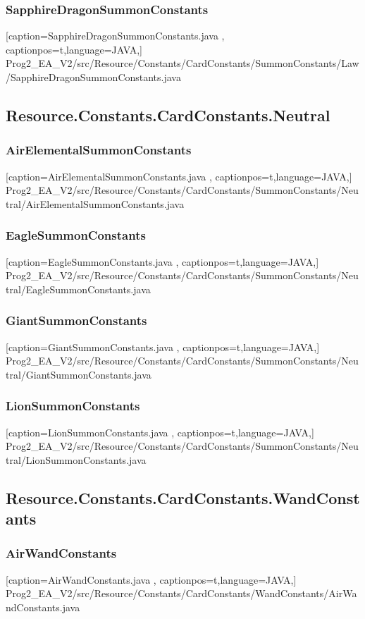 \documentclass[a4paper,12pt]{scrartcl}
\begin{document}
	\subsubsection{SapphireDragonSummonConstants}
	
	[caption={SapphireDragonSummonConstants.java}
	\label{lst:javaclass},
	captionpos=t,language=JAVA,]
	{Prog2_EA_V2/src/Resource/Constants/CardConstants/SummonConstants/Law/SapphireDragonSummonConstants.java}
	\subsection{Resource.Constants.CardConstants.Neutral}
	\subsubsection{AirElementalSummonConstants}
	
	[caption={AirElementalSummonConstants.java}
	\label{lst:javaclass},
	captionpos=t,language=JAVA,]
	{Prog2_EA_V2/src/Resource/Constants/CardConstants/SummonConstants/Neutral/AirElementalSummonConstants.java}
	\subsubsection{EagleSummonConstants}
	
	[caption={EagleSummonConstants.java}
	\label{lst:javaclass},
	captionpos=t,language=JAVA,]
	{Prog2_EA_V2/src/Resource/Constants/CardConstants/SummonConstants/Neutral/EagleSummonConstants.java}
	\subsubsection{GiantSummonConstants}
	
	[caption={GiantSummonConstants.java}
	\label{lst:javaclass},
	captionpos=t,language=JAVA,]
	{Prog2_EA_V2/src/Resource/Constants/CardConstants/SummonConstants/Neutral/GiantSummonConstants.java}
	\subsubsection{LionSummonConstants}
	
	[caption={LionSummonConstants.java}
	\label{lst:javaclass},
	captionpos=t,language=JAVA,]
	{Prog2_EA_V2/src/Resource/Constants/CardConstants/SummonConstants/Neutral/LionSummonConstants.java}
	\subsection{Resource.Constants.CardConstants.WandConstants}
	\subsubsection{AirWandConstants}
	
	[caption={AirWandConstants.java}
	\label{lst:javaclass},
	captionpos=t,language=JAVA,]
	{Prog2_EA_V2/src/Resource/Constants/CardConstants/WandConstants/AirWandConstants.java}
\end{document}
